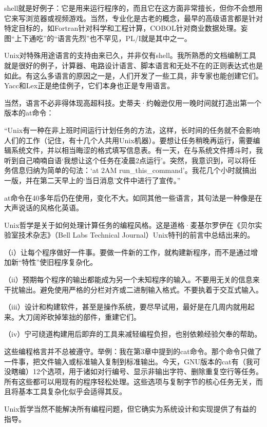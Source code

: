 \documentclass[a4paper,12pt,UTF8,twoside]{ctexbook}
\begin{document}
shell就是好例子：它是用来运行程序的，而且它在这方面非常擅长，但你不会想用它来写浏览器或视频游戏。当然，专业化是古老的概念，最早的高级语言都是针对特定目标的，如Fortran针对科学和工程计算，COBOL针对商业数据处理。妄图“上下通吃”的“语言先烈”也不罕见，PL/I就是其中之一。

Unix对特殊用途语言的支持由来已久，并非仅有shell。我所熟悉的文档编制工具就是很好的例子，计算器、电路设计语言、脚本语言和无处不在的正则表达式也是如此。有这么多语言的原因之一是，人们开发了一些工具，非专家也能创建它们。Yacc和Lex正是绝佳例子，它们本身也正是专用语言。

当然，语言不必非得体现高超科技。史蒂夫·约翰逊仅用一晚时间就打造出第一个版本的at命令：

“Unix有一种在非上班时间运行计划任务的方法，这样，长时间的任务就不会影响人们的工作（记住，有十几个人共用Unix机器）。要想让任务稍晚再运行，需要编辑系统文件，并以相当晦涩的格式填写信息表。有一天，在与系统文件搏斗时，我听到自己喃喃自语‘我想让这个任务在凌晨2点运行’。突然，我意识到，可以将任务信息归纳为简单的句法：‘at 2AM run\_this\_command’。我花几个小时就搞出一版，并在第二天早上的‘当日消息’文件中进行了宣传。”



at命令在40多年后仍在使用，变化不大。如同其他一些语言，其句法是一种像是在大声说话的风格化英语。

Unix哲学是关于如何处理计算任务的编程风格。这是道格·麦基尔罗伊在《贝尔实验室技术杂志》（Bell Labs Technical Journal）Unix特刊的前言中总结出来的。

（i）让每个程序做好一件事。要做一件新的工作，就构建新程序，而不是通过增加新“特性”使旧程序复杂化。

（ii）预期每个程序的输出都能成为另一个未知程序的输入。不要用无关的信息来干扰输出。避免使用严格的分栏对齐或二进制输入格式。不要执着于交互式输入。

（iii）设计和构建软件，甚至是操作系统，要尽早试用，最好是在几周内就用起来。大刀阔斧砍掉笨拙的部件，重建它们。

（iv）宁可绕道构建用后即弃的工具来减轻编程负担，也别依赖经验欠奉的帮助。

这些编程格言并不总被遵守。举例：我在第3章中提到的cat命令。那个命令只做了一件事，把文件输入或标准输入复制到标准输出。今天，GNU版本的cat有（我可没瞎编）12个选项，用于诸如对行编号、显示非输出字符、删除重复空行等任务。所有这些都可以用现有的程序轻松处理。这些选项与复制字节的核心任务无关，而且将基本工具复杂化似乎会适得其反。

Unix哲学当然不能解决所有编程问题，但它确实为系统设计和实现提供了有益的指导。
\end{document}
